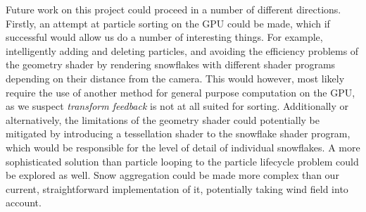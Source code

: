\documentclass[conference]{acmsiggraph}
\begin{document}
Future work on this project could proceed in a number of different directions. Firstly, an attempt at particle sorting on the GPU could be made, which if successful would allow us do a number of interesting things. For example, intelligently adding and deleting particles, and avoiding the efficiency problems of the geometry shader by rendering snowflakes with different shader programs depending on their distance from the camera. This would however, most likely require the use of another method for general purpose computation on the GPU, as we suspect \textit{transform feedback} is not at all suited for sorting. Additionally or alternatively, the limitations of the geometry shader could potentially be mitigated by introducing a tessellation shader to the snowflake shader program, which would be responsible for the level of detail of individual snowflakes. A more sophisticated solution than particle looping to the particle lifecycle problem could be explored as well. Snow aggregation could be made more complex than our current, straightforward implementation of it, potentially taking wind field into account.


\nocite{*}

\end{document}
